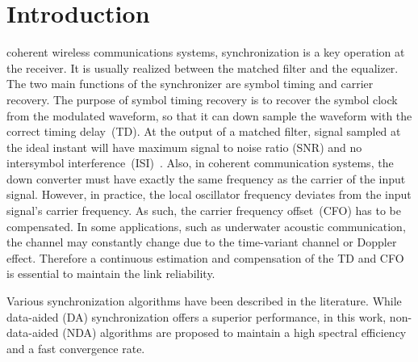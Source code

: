 \documentclass[journal,comsoc, onecolumn, 12pt,draftclsnofoot]{IEEEtran} %
\begin{document}
\section{Introduction}
\label{sec:intro}
 coherent wireless communications systems, synchronization is a key operation at the receiver.
It is usually realized between the matched filter and the equalizer.
The two main functions of the synchronizer are symbol timing and carrier recovery.
The purpose of symbol timing recovery is to recover the symbol clock from the modulated waveform, so that it can down sample the waveform with the correct timing delay~(TD).
At the output of a matched filter, signal sampled at the ideal instant will have maximum signal to noise ratio (SNR) and no intersymbol interference~(ISI)~\cite{mengali1997synchronization}.
Also, in coherent communication systems, the down converter must have exactly the same frequency as the carrier of the input signal. 
However, in practice, the local oscillator frequency deviates from the input signal's carrier frequency.  
As such, the carrier frequency offset~(CFO) has to be compensated. 
In some applications, such as underwater acoustic communication, the channel may constantly change due to the time-variant channel or Doppler effect. 
Therefore a continuous estimation and compensation of the TD and CFO is essential to maintain the link reliability.

Various synchronization algorithms have been described in the literature.
While data-aided (DA) synchronization offers a superior performance, in this work, non-data-aided (NDA) algorithms  are proposed to maintain a high spectral efficiency and a fast convergence rate. 




\end{document}
